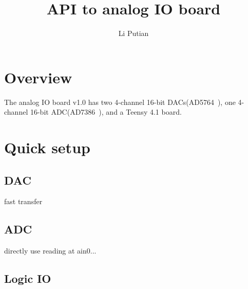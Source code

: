 \documentclass[pre, 12pt]{revtex4}
\begin{document}
\title{API to analog IO board}
\author{Li Putian}
\maketitle
\section{Overview}
The analog IO board v1.0 has two 4-channel 16-bit DACs(AD5764~\parencite{AD5764}), one 4-channel 16-bit ADC(AD7386~\parencite{AD7386}), and a Teensy 4.1 board. 

\section{Quick setup} 
\subsection{DAC}
fast transfer

\subsection{ADC}
directly use reading at ain0... 

\subsection{Logic IO} 

\section{}
\nocite{*}


\end{document}
